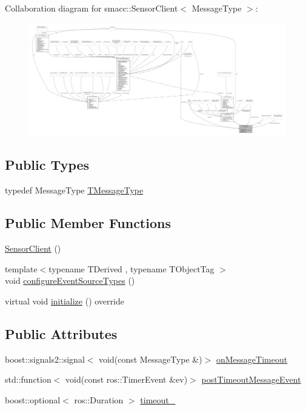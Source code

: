 Collaboration diagram for smacc\+:\+:Sensor\+Client$<$ Message\+Type $>$\+:
\nopagebreak
\begin{figure}[H]
\begin{center}
\leavevmode
\includegraphics[width=350pt]{classsmacc_1_1SensorClient__coll__graph}
\end{center}
\end{figure}
\subsection*{Public Types}
\begin{DoxyCompactItemize}
\item 
typedef Message\+Type \hyperlink{classsmacc_1_1SensorClient_a5a35234e021e849d213a3dae58094ac5}{T\+Message\+Type}
\end{DoxyCompactItemize}
\subsection*{Public Member Functions}
\begin{DoxyCompactItemize}
\item 
\hyperlink{classsmacc_1_1SensorClient_a3d33430d7b925d88d816d384d3c533c1}{Sensor\+Client} ()
\item 
{\footnotesize template$<$typename T\+Derived , typename T\+Object\+Tag $>$ }\\void \hyperlink{classsmacc_1_1SensorClient_ae1384ddfe1fab2c119be52b587dd6071}{configure\+Event\+Source\+Types} ()
\item 
virtual void \hyperlink{classsmacc_1_1SensorClient_aab9ae52c239305f09cfc4aa48e533ef8}{initialize} () override
\end{DoxyCompactItemize}
\subsection*{Public Attributes}
\begin{DoxyCompactItemize}
\item 
boost\+::signals2\+::signal$<$ void(const Message\+Type \&)$>$ \hyperlink{classsmacc_1_1SensorClient_a3652c00d16a1a82ef6b43466ef360c72}{on\+Message\+Timeout}
\item 
std\+::function$<$ void(const ros\+::\+Timer\+Event \&ev)$>$ \hyperlink{classsmacc_1_1SensorClient_ad2c6d9f2e7ceddac26024cd5901a6739}{post\+Timeout\+Message\+Event}
\item 
boost\+::optional$<$ ros\+::\+Duration $>$ \hyperlink{classsmacc_1_1SensorClient_a660452b6940625d3c60581961124ebd8}{timeout\+\_\+}
\end{DoxyCompactItemize}
